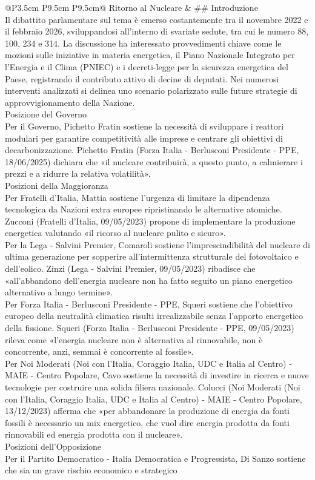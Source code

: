 \documentclass[a4paper,11pt]{article}
\begin{document}
\begin{landscape}
\begin{longtable}{@{}P{3.5cm} P{9.5cm} P{9.5cm}@{}}
\midrule
Ritorno al Nucleare & \#\# Introduzione\\[6pt] Il dibattito parlamentare sul tema è emerso costantemente tra il novembre 2022 e il febbraio 2026, sviluppandosi all'interno di svariate sedute, tra cui le numero 88, 100, 234 e 314. La discussione ha interessato provvedimenti chiave come le mozioni sulle iniziative in materia energetica, il Piano Nazionale Integrato per l'Energia e il Clima (PNIEC) e i decreti-legge per la sicurezza energetica del Paese, registrando il contributo attivo di decine di deputati. Nei numerosi interventi analizzati si delinea uno scenario polarizzato sulle future strategie di approvvigionamento della Nazione.\\[6pt] Posizione del Governo\\[6pt] Per il Governo, Pichetto Fratin sostiene la necessità di sviluppare i reattori modulari per garantire competitività alle imprese e centrare gli obiettivi di decarbonizzazione. Pichetto Fratin (Forza Italia - Berlusconi Presidente - PPE, 18/06/2025) dichiara che «il nucleare contribuirà, a questo punto, a calmierare i prezzi e a ridurre la relativa volatilità».\\[6pt] Posizioni della Maggioranza\\[6pt] Per Fratelli d'Italia, Mattia sostiene l'urgenza di limitare la dipendenza tecnologica da Nazioni extra europee ripristinando le alternative atomiche. Zucconi (Fratelli d'Italia, 09/05/2023) propone di implementare la produzione energetica valutando «il ricorso al nucleare pulito e sicuro».\\[6pt] Per la Lega - Salvini Premier, Comaroli sostiene l'imprescindibilità del nucleare di ultima generazione per sopperire all'intermittenza strutturale del fotovoltaico e dell'eolico. Zinzi (Lega - Salvini Premier, 09/05/2023) ribadisce che «all'abbandono dell'energia nucleare non ha fatto seguito un piano energetico alternativo a lungo termine».\\[6pt] Per Forza Italia - Berlusconi Presidente - PPE, Squeri sostiene che l'obiettivo europeo della neutralità climatica risulti irrealizzabile senza l'apporto energetico della fissione. Squeri (Forza Italia - Berlusconi Presidente - PPE, 09/05/2023) rileva come «l'energia nucleare non è alternativa al rinnovabile, non è concorrente, anzi, semmai è concorrente al fossile».\\[6pt] Per Noi Moderati (Noi con l'Italia, Coraggio Italia, UDC e Italia al Centro) - MAIE - Centro Popolare, Cavo sostiene la necessità di investire in ricerca e nuove tecnologie per costruire una solida filiera nazionale. Colucci (Noi Moderati (Noi con l'Italia, Coraggio Italia, UDC e Italia al Centro) - MAIE - Centro Popolare, 13/12/2023) afferma che «per abbandonare la produzione di energia da fonti fossili è necessario un mix energetico, che vuol dire energia prodotta da fonti rinnovabili ed energia prodotta con il nucleare».\\[6pt] Posizioni dell'Opposizione\\[6pt] Per il Partito Democratico - Italia Democratica e Progressista, Di Sanzo sostiene che sia un grave rischio economico e strategico 
\end{longtable}
\end{landscape}
\end{document}
